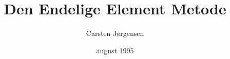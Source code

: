 \documentclass[a4paper,12pt]{report}
\begin{document}
\parindent 0cm

  
\title{Den Endelige Element Metode}
\author{Carsten Jørgensen}
\date{august 1995}
\maketitle




\tableofcontents
\listoffigures
\listoftables
{}











\end{document}
